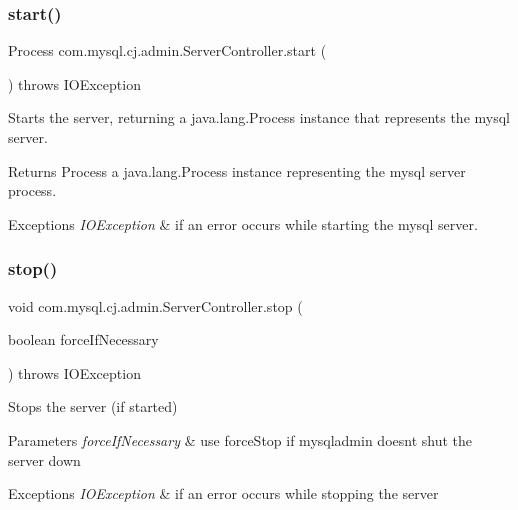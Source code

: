 \subsubsection{\texorpdfstring{start()}{start()}}
{\footnotesize\ttfamily Process com.\+mysql.\+cj.\+admin.\+Server\+Controller.\+start (\begin{DoxyParamCaption}{ }\end{DoxyParamCaption}) throws I\+O\+Exception}

Starts the server, returning a java.\+lang.\+Process instance that represents the mysql server.

\begin{DoxyReturn}{Returns}
Process a java.\+lang.\+Process instance representing the mysql server process. 
\end{DoxyReturn}

\begin{DoxyExceptions}{Exceptions}
{\em I\+O\+Exception} & if an error occurs while starting the mysql server. \\
\hline
\end{DoxyExceptions}
\mbox{\label{classcom_1_1mysql_1_1cj_1_1admin_1_1_server_controller_a2b02c22e29bec215e59ec6d1f2995f48}} 
\subsubsection{\texorpdfstring{stop()}{stop()}}
{\footnotesize\ttfamily void com.\+mysql.\+cj.\+admin.\+Server\+Controller.\+stop (\begin{DoxyParamCaption}\item[{boolean}]{force\+If\+Necessary }\end{DoxyParamCaption}) throws I\+O\+Exception}

Stops the server (if started)


\begin{DoxyParams}{Parameters}
{\em force\+If\+Necessary} & use force\+Stop if mysqladmin doesn\textquotesingle{}t shut the server down\\
\hline
\end{DoxyParams}

\begin{DoxyExceptions}{Exceptions}
{\em I\+O\+Exception} & if an error occurs while stopping the server \\
\hline
\end{DoxyExceptions}


